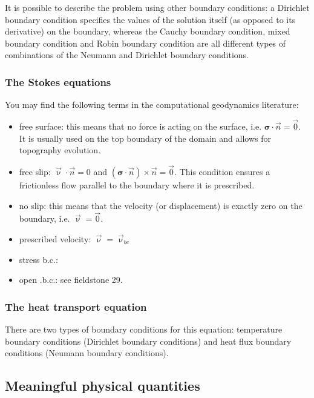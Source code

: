 It is possible to describe the problem using other boundary conditions: 
a Dirichlet boundary condition specifies the values of the solution itself 
(as opposed to its derivative) on the boundary, whereas the Cauchy boundary condition, mixed boundary condition and Robin boundary condition are all different types of combinations of the Neumann and Dirichlet boundary conditions.


\subsubsection{The Stokes equations}

You may find the following terms in the computational geodynamics literature:

\begin{itemize}
\item { free surface}: this means that no force is acting on the surface, i.e. ${\bm \sigma}\cdot {\vec n}={\vec 0}$. It is usually used on the top boundary of the domain and allows for topography evolution.
\item { free slip}: ${\vec \upnu}\cdot \vec n = 0$ and $({\bm \sigma}\cdot{\vec n})\times {\vec n}={\vec 0}$. This condition ensures a frictionless flow parallel to the boundary where it is prescribed.
\item { no slip}: this means that the velocity (or displacement) is exactly zero on the boundary, i.e. ${\vec \upnu}={\vec 0}$.
\item { prescribed velocity}: ${\vec \upnu}={\vec \upnu}_{bc}$
\item stress b.c.: 
\item open .b.c.: see fieldstone 29. 
\end{itemize}

\subsubsection{The heat transport equation}

There are two types of boundary conditions for this equation: temperature boundary conditions (Dirichlet boundary conditions) and heat flux boundary conditions (Neumann boundary conditions). 

\newpage
\subsection{Meaningful physical quantities}

